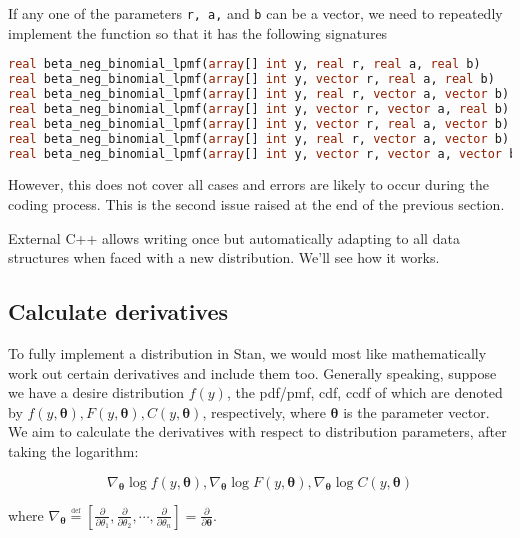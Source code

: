\documentclass[11pt]{article}
\begin{document}
If any one of the parameters \verb|r, a,| and \verb|b| can be a vector, we need to repeatedly implement the function so that it has the following signatures
\begin{lstlisting}[language=Stan, style=lgeneral]
real beta_neg_binomial_lpmf(array[] int y, real r, real a, real b)
real beta_neg_binomial_lpmf(array[] int y, vector r, real a, real b)
real beta_neg_binomial_lpmf(array[] int y, real r, vector a, vector b)
real beta_neg_binomial_lpmf(array[] int y, vector r, vector a, real b)
real beta_neg_binomial_lpmf(array[] int y, vector r, real a, vector b)
real beta_neg_binomial_lpmf(array[] int y, real r, vector a, vector b)
real beta_neg_binomial_lpmf(array[] int y, vector r, vector a, vector b)
\end{lstlisting}
However, this does not cover all cases and errors are likely to occur during the coding process. This is the second issue raised at the end of the previous section.

External C++ allows writing once but automatically adapting to all data structures when faced with a new distribution. We'll see how it works.



\subsection{Calculate derivatives}

To fully implement a distribution in Stan, we would most like mathematically work out certain derivatives and include them too. Generally speaking, suppose we have a desire distribution $f(y)$, the pdf/pmf, cdf, ccdf of which are denoted by $f(y,\boldsymbol\theta), F(y,\boldsymbol\theta), C(y,\boldsymbol\theta)$, respectively, where $\boldsymbol\theta$ is the parameter vector. We aim to calculate the derivatives with respect to distribution parameters, after taking the logarithm:

\begin{equation}
\nabla_{\boldsymbol{\theta}} \log f(y,\boldsymbol\theta), \nabla_{\boldsymbol{\theta}}\log F(y,\boldsymbol\theta), \nabla_{\boldsymbol {\theta}}\log C(y,\boldsymbol\theta)
\end{equation}

where $ \nabla_{\boldsymbol{\theta}}{\overset{\underset {\mathrm{def} }{}}{=}}\left[{\frac{\partial }{\partial \theta_{1}}},{\frac{\partial }{\partial \theta_{2}}},\cdots ,{\frac{\partial }{\partial \theta_{n}}}\right]={\frac{\partial }{\partial {\boldsymbol{\theta}}}}.$
\end{document}
